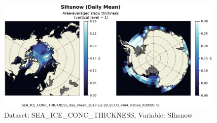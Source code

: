 \begin{figure}[H]
\centering
\includegraphics[scale=0.55]{../images/plots/native_plots/Sea-Ice_and_Snow_Concentration_and_Thickness/SIhsnow.png}
\caption{Dataset: SEA\_ICE\_CONC\_THICKNESS, Variable: SIhsnow}
\label{tab:table-SEA_ICE_CONC_THICKNESS_SIhsnow-Plot}
\end{figure}
\newpage
\pagebreak

